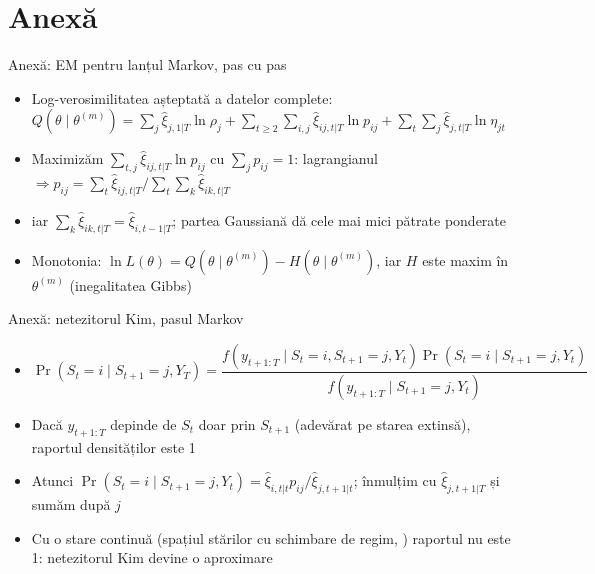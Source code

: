 \section{Anexă}

\begin{frame}{Anexă: EM pentru lanțul Markov, pas cu pas}
\hypertarget{atsapp1}{}
\itemsize{\small}
\begin{itemize}
    \item Log-verosimilitatea așteptată a datelor complete: $Q(\theta \mid \theta^{(m)}) = \sum_j\hat\xi_{j,1|T}\ln\rho_j + \sum_{t\ge2}\sum_{i,j}\hat\xi_{ij,t|T}\ln p_{ij} + \sum_t\sum_j\hat\xi_{j,t|T}\ln\eta_{jt}$
    \item Maximizăm $\sum_{t,j}\hat\xi_{ij,t|T}\ln p_{ij}$ cu $\sum_j p_{ij} = 1$: lagrangianul $\Rightarrow p_{ij} = \sum_t\hat\xi_{ij,t|T}/\sum_t\sum_k\hat\xi_{ik,t|T}$
    \item iar $\sum_k\hat\xi_{ik,t|T} = \hat\xi_{i,t-1|T}$; partea Gaussiană dă cele mai mici pătrate ponderate
    \item Monotonia: $\ln L(\theta) = Q(\theta \mid \theta^{(m)}) - H(\theta \mid \theta^{(m)})$, iar $H$ este maxim în $\theta^{(m)}$ (inegalitatea Gibbs) 
\end{itemize}
\end{frame}

\begin{frame}{Anexă: netezitorul Kim, pasul Markov}
\hypertarget{atsapp2}{}
\itemsize{\small}
\begin{itemize}
    \item $\Pr(S_t = i \mid S_{t+1} = j, Y_T) = \dfrac{f(y_{t+1:T} \mid S_t = i, S_{t+1} = j, Y_t)\Pr(S_t = i \mid S_{t+1} = j, Y_t)}{f(y_{t+1:T} \mid S_{t+1} = j, Y_t)}$
    \item Dacă $y_{t+1:T}$ depinde de $S_t$ doar prin $S_{t+1}$ (adevărat pe starea extinsă), raportul densităților este 1
    \item Atunci $\Pr(S_t = i \mid S_{t+1} = j, Y_t) = \hat\xi_{i,t|t}p_{ij}/\hat\xi_{j,t+1|t}$; înmulțim cu $\hat\xi_{j,t+1|T}$ și sumăm după $j$
    \item Cu o stare continuă (spațiul stărilor cu schimbare de regim, ) raportul nu este 1: netezitorul Kim devine o aproximare
\end{itemize}
\end{frame}


